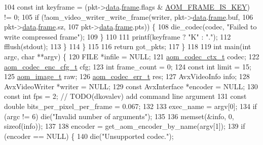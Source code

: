 \begin{DoxyCodeInclude}
{104       \textcolor{keyword}{const} \textcolor{keywordtype}{int} keyframe = (pkt->\hyperlink{structaom__codec__cx__pkt_afb379cd4bfa7692d1d6e85f4e4b2b410}{data}.\hyperlink{structaom__codec__cx__pkt_a4180a6ae59b0d295bc915d4689df4cb0}{frame}.flags & \hyperlink{group__encoder_gaf4a58f123913a5eef0a3796f0619e5f3}{AOM\_FRAME\_IS\_KEY}) != 0;
105       \textcolor{keywordflow}{if} (!aom\_video\_writer\_write\_frame(writer, pkt->\hyperlink{structaom__codec__cx__pkt_afb379cd4bfa7692d1d6e85f4e4b2b410}{data}.\hyperlink{structaom__codec__cx__pkt_a4180a6ae59b0d295bc915d4689df4cb0}{frame}.buf,
106                                         pkt->\hyperlink{structaom__codec__cx__pkt_afb379cd4bfa7692d1d6e85f4e4b2b410}{data}.\hyperlink{structaom__codec__cx__pkt_a4180a6ae59b0d295bc915d4689df4cb0}{frame}.sz,
107                                         pkt->\hyperlink{structaom__codec__cx__pkt_afb379cd4bfa7692d1d6e85f4e4b2b410}{data}.\hyperlink{structaom__codec__cx__pkt_a4180a6ae59b0d295bc915d4689df4cb0}{frame}.pts)) \{
108         die\_codec(codec, \textcolor{stringliteral}{"Failed to write compressed frame"});
109       \}
110 
111       printf(keyframe ? \textcolor{stringliteral}{"K"} : \textcolor{stringliteral}{"."});
112       fflush(stdout);
113     \}
114   \}
115 
116   \textcolor{keywordflow}{return} got\_pkts;
117 \}
118 
119 \textcolor{keywordtype}{int} main(\textcolor{keywordtype}{int} argc, \textcolor{keywordtype}{char} **argv) \{
120   FILE *infile = NULL;
121   \hyperlink{structaom__codec__ctx}{aom\_codec\_ctx\_t} codec;
122   \hyperlink{structaom__codec__enc__cfg}{aom\_codec\_enc\_cfg\_t} cfg;
123   \textcolor{keywordtype}{int} frame\_count = 0;
124   \textcolor{keyword}{const} \textcolor{keywordtype}{int} limit = 15;
125   \hyperlink{structaom__image}{aom\_image\_t} raw;
126   \hyperlink{group__codec_gaaae61e0f8663e6137f1e228757248e7c}{aom\_codec\_err\_t} res;
127   AvxVideoInfo info;
128   AvxVideoWriter *writer = NULL;
129   \textcolor{keyword}{const} AvxInterface *encoder = NULL;
130   \textcolor{keyword}{const} \textcolor{keywordtype}{int} fps = 2;  \textcolor{comment}{// TODO(dkovalev) add command line argument}
131   \textcolor{keyword}{const} \textcolor{keywordtype}{double} bits\_per\_pixel\_per\_frame = 0.067;
132 
133   exec\_name = argv[0];
134   \textcolor{keywordflow}{if} (argc != 6) die(\textcolor{stringliteral}{"Invalid number of arguments"});
135 
136   memset(&info, 0, \textcolor{keyword}{sizeof}(info));
137 
138   encoder = get\_aom\_encoder\_by\_name(argv[1]);
139   \textcolor{keywordflow}{if} (encoder == NULL) \{
140     die(\textcolor{stringliteral}{"Unsupported codec."});
}
\end{DoxyCodeInclude}
